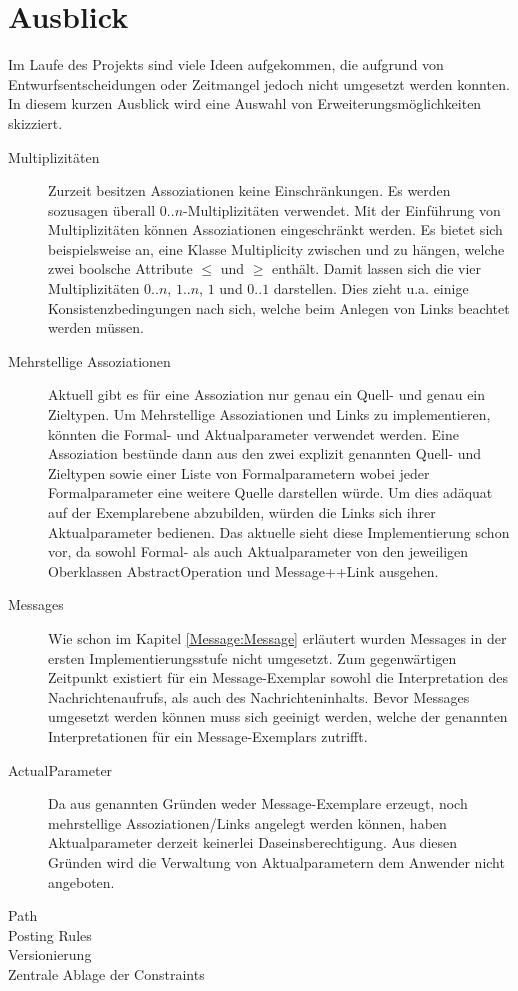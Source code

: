 \section{Ausblick}
Im Laufe des Projekts sind viele Ideen aufgekommen, die aufgrund von Entwurfsentscheidungen oder Zeitmangel 
jedoch nicht umgesetzt werden konnten. In diesem kurzen Ausblick wird eine Auswahl von Erweiterungsmöglichkeiten skizziert.

\begin{description}
  \item[Multiplizitäten] Zurzeit besitzen Assoziationen keine Einschränkungen. 
Es werden sozusagen überall $0..n$-Multiplizitäten verwendet. 
Mit der Einführung von Multiplizitäten können Assoziationen eingeschränkt werden.
Es bietet sich beispielsweise an, eine Klasse Multiplicity zwischen  und  zu hängen,
welche zwei boolsche Attribute $\leq$ und $\geq$ enthält. 
Damit lassen sich die vier Multiplizitäten $0..n$, $1..n$, $1$ und $0..1$ darstellen.
Dies zieht u.a. einige Konsistenzbedingungen nach sich, welche beim Anlegen von Links beachtet werden müssen. 
  \item[Mehrstellige Assoziationen] Aktuell gibt es für eine Assoziation nur genau ein Quell- und genau ein Zieltypen. Um Mehrstellige Assoziationen und Links zu implementieren, könnten die Formal- und Aktualparameter verwendet werden. Eine Assoziation bestünde dann aus den zwei explizit genannten Quell- und Zieltypen sowie einer Liste von Formalparametern wobei jeder Formalparameter eine weitere Quelle darstellen würde. Um dies adäquat auf der Exemplarebene abzubilden, würden die Links sich ihrer Aktualparameter bedienen. Das aktuelle \MM sieht diese Implementierung schon vor, da sowohl Formal- als auch Aktualparameter von den jeweiligen Oberklassen AbstractOperation und Message++Link ausgehen.
  \item[Messages] Wie schon im Kapitel \ref{Message:Message} erläutert wurden Messages in der ersten Implementierungsstufe nicht umgesetzt. Zum gegenwärtigen Zeitpunkt existiert für ein Message-Exemplar sowohl die Interpretation des Nachrichtenaufrufs, als auch des Nachrichteninhalts.
Bevor Messages umgesetzt werden können muss sich geeinigt werden, welche der genannten Interpretationen für ein Message-Exemplars zutrifft. 
  \item[ActualParameter] Da aus genannten Gründen weder Message-Exemplare erzeugt, noch mehrstellige Assoziationen/Links angelegt werden können, haben Aktualparameter derzeit keinerlei Daseinsberechtigung. Aus diesen Gründen wird die Verwaltung von Aktualparametern dem Anwender nicht angeboten.
  \item[Path]
  \item[Posting Rules]
  \item[Versionierung]
  \item[Zentrale Ablage der Constraints]
\end{description}
  